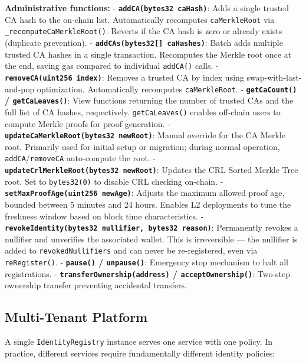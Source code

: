 \documentclass[11pt, a4paper]{article}
\begin{document}
\textbf{Administrative functions:} -
\textbf{\texttt{addCA(bytes32\ caHash)}}: Adds a single trusted CA hash
to the on-chain list. Automatically recomputes \texttt{caMerkleRoot} via
\texttt{\_recomputeCaMerkleRoot()}. Reverts if the CA hash is zero or
already exists (duplicate prevention). -
\textbf{\texttt{addCAs(bytes32{[}{]}\ caHashes)}}: Batch adds multiple
trusted CA hashes in a single transaction. Recomputes the Merkle root
once at the end, saving gas compared to individual \texttt{addCA()}
calls. - \textbf{\texttt{removeCA(uint256\ index)}}: Removes a trusted
CA by index using swap-with-last-and-pop optimization. Automatically
recomputes \texttt{caMerkleRoot}. - \textbf{\texttt{getCaCount()} /
\texttt{getCaLeaves()}}: View functions returning the number of trusted
CAs and the full list of CA hashes, respectively. \texttt{getCaLeaves()}
enables off-chain users to compute Merkle proofs for proof generation. -
\textbf{\texttt{updateCaMerkleRoot(bytes32\ newRoot)}}: Manual override
for the CA Merkle root. Primarily used for initial setup or migration;
during normal operation, \texttt{addCA}/\texttt{removeCA} auto-compute
the root. - \textbf{\texttt{updateCrlMerkleRoot(bytes32\ newRoot)}}:
Updates the CRL Sorted Merkle Tree root. Set to \texttt{bytes32(0)} to
disable CRL checking on-chain. -
\textbf{\texttt{setMaxProofAge(uint256\ newAge)}}: Adjusts the maximum
allowed proof age, bounded between 5 minutes and 24 hours. Enables L2
deployments to tune the freshness window based on block time
characteristics. -
\textbf{\texttt{revokeIdentity(bytes32\ nullifier,\ bytes32\ reason)}}:
Permanently revokes a nullifier and unverifies the associated wallet.
This is irreversible --- the nullifier is added to
\texttt{revokedNullifiers} and can never be re-registered, even via
\texttt{reRegister()}. - \textbf{\texttt{pause()} / \texttt{unpause()}}:
Emergency stop mechanism to halt all registrations. -
\textbf{\texttt{transferOwnership(address)} /
\texttt{acceptOwnership()}}: Two-step ownership transfer preventing
accidental transfers.

\subsection{Multi-Tenant Platform}\label{multi-tenant-platform}

A single \texttt{IdentityRegistry} instance serves one service with one
policy. In practice, different services require fundamentally different
identity policies:
\end{document}
